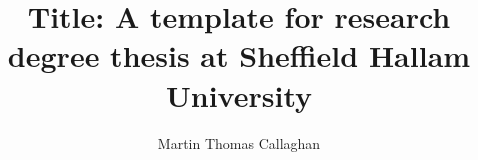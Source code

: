 \title{Title: A template for research degree thesis at Sheffield Hallam University}


\author{Martin Thomas Callaghan}








